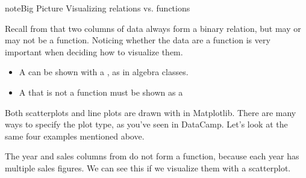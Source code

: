 \documentclass[letterpaper,10pt,english]{jupyterBook}
\begin{document}
\begin{sphinxadmonition}{note}{Big Picture \sphinxhyphen{} Visualizing relations vs. functions}

\sphinxAtStartPar
Recall from {\hyperref[\detokenize{chapter-2-mathematical-foundations::doc}]{}} that two columns of data always form a binary relation, but may or may not be a function.  Noticing whether the data are a function is very important when deciding how to visualize them.
\begin{itemize}
\item {} 
\sphinxAtStartPar
A  can be shown with a , as in algebra classes.

\item {} 
\sphinxAtStartPar
A  that is not a function must be shown as a 

\end{itemize}
\end{sphinxadmonition}

\sphinxAtStartPar
Both scatterplots and line plots are drawn with  in Matplotlib.  There are many ways to specify the plot type, as you’ve seen in DataCamp.  Let’s look at the same four examples mentioned above.

\sphinxAtStartPar
{} The year and sales columns from  do not form a function, because each year has multiple sales figures.  We can see this if we visualize them with a scatterplot.

\begin{sphinxVerbatim}[commandchars=\\\{\}]
   
 \PYG{p}{[}\PYG{p}{]} \PYG{p}{[}\PYG{p}{]}   
      
  
  
\end{sphinxVerbatim}
\end{document}
